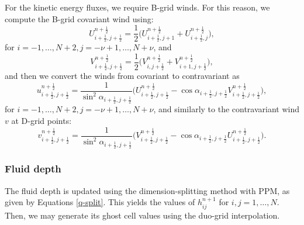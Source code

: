 For the kinetic energy fluxes, we require B-grid winds. 
For this reason, we compute the B-grid covariant wind using:
\begin{equation}
	\label{bgrid-U}
	U_{i+\frac{1}{2},j+\frac{1}{2}}^{n+\frac{1}{2}}	= 
	\frac{1}{2}\big(U_{i+\frac{1}{2},j+1}^{n+\frac{1}{2}} + U_{i+\frac{1}{2},j}^{n+\frac{1}{2}} \big),
\end{equation}
for $i=-1,\ldots,N+2, j=-\nu+1,\ldots,N+\nu$, and
\begin{equation}
	\label{bgrid-V}
	V_{i+\frac{1}{2},j+\frac{1}{2}}^{n+\frac{1}{2}}	= 
	\frac{1}{2}\big(V_{i,j+\frac{1}{2}}^{n+\frac{1}{2}} + V_{i+1,j+\frac{1}{2}}^{n+\frac{1}{2}} \big),
\end{equation}
and then we convert the winds from covariant to contravariant as
\begin{equation}
	\label{bgrid-UU}
	u_{i+\frac{1}{2},j+\frac{1}{2}}^{n+\frac{1}{2}}	= \frac{1}{\sin^2{\alpha_{i+\frac{1}{2},j+\frac{1}{2}}}}\bigg(
	U_{i+\frac{1}{2},j+\frac{1}{2}}^{n+\frac{1}{2}} - \cos{\alpha_{i+\frac{1}{2},j+\frac{1}{2}}}V_{i+\frac{1}{2},j+\frac{1}{2}}^{n+\frac{1}{2}}\bigg),
\end{equation}
for $i=-1,\ldots,N+2, j=-\nu+1,\ldots,N+\nu$, and similarly to the contravariant wind $v$ at D-grid points:
\begin{equation}
	\label{bgrid-VV}
	v_{i+\frac{1}{2},j+\frac{1}{2}}^{n+\frac{1}{2}}	= \frac{1}{\sin^2{\alpha_{i+\frac{1}{2},j+\frac{1}{2}}}}\bigg(
	V_{i+\frac{1}{2},j+\frac{1}{2}}^{n+\frac{1}{2}} - \cos{\alpha_{i+\frac{1}{2},j+\frac{1}{2}}}U_{i+\frac{1}{2},j+\frac{1}{2}}^{n+\frac{1}{2}}\bigg).
\end{equation}

\subsubsection{Fluid depth}
The fluid depth is updated using the dimension-splitting method with PPM, as given by Equations \eqref{q-split}. 
This yields the values of $h_{ij}^{n+1}$ for $i,j=1, \ldots, N$.
Then, we may generate its ghost cell values using the duo-grid interpolation.

